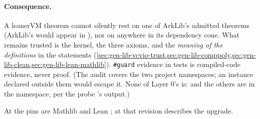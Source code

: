 \paragraph{Consequence.} A leanerVM theorem cannot silently rest on one of ArkLib's admitted
theorems (ArkLib's  would appear in ), nor on
 anywhere in its dependency cone. What remains trusted is the kernel, the
three axioms, and the \emph{meaning of the definitions} in the statements
(\cref{sec:gen-lib-vcvio-trust,sec:gen-lib-comppoly,sec:gen-lib-clean,sec:gen-lib-lean-mathlib}).
\texttt{\#guard} evidence in tests is compiled-code evidence, never proof. (The audit covers the two
project namespaces; an instance declared outside them would escape it. None of Layer 0's is:
\allowbreak{}\allowbreak{} and the others are in the namespace, per the probe
's output.)

At  the pins are Mathlib and Lean ; \allowbreak{} at
that revision describes the upgrade.

\par\endgroup